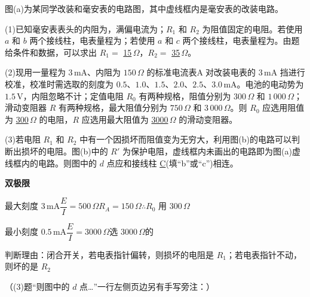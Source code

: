\begin{problem}[剪贴印刷题·9分]
图(a)为某同学改装和毫安表的电路图，其中虚线框内是毫安表的改装电路。%

(1)已知毫安表表头的内阻为，满偏电流为；$R_1$ 和 $R_2$ 为阻值固定的电阻。若使用 $a$ 和 $b$ 两个接线柱，电表量程为；若使用 $a$ 和 $c$ 两个接线柱，电表量程为。由题给条件和数据，可以求出 $R_1=$ \underline{\hspace{0.6em}15\hspace{0.6em}}\,$\Omega$，$R_2=$ \underline{\hspace{0.6em}35\hspace{0.6em}}\,$\Omega$。%

(2)现用一量程为 $3\,\mathrm{mA}$、内阻为 $150\,\Omega$ 的标准电流表\textcircled{A}对改装电表的 $3\,\mathrm{mA}$ 挡进行校准，校准时需选取的刻度为 $0.5$、$1.0$、$1.5$、$2.0$、$2.5$、$3.0\,\mathrm{mA}$。电池的电动势为 $1.5\,\mathrm{V}$，内阻忽略不计；定值电阻 $R_0$ 有两种规格，阻值分别为 $300\,\Omega$ 和 $1\,000\,\Omega$；滑动变阻器 $R$ 有两种规格，最大阻值分别为 $750\,\Omega$ 和 $3\,000\,\Omega$。则 $R_0$ 应选用阻值为 \underline{\hspace{0.4em}300\hspace{0.4em}}\,$\Omega$ 的电阻，$R$ 应选用最大阻值为 \underline{\hspace{0.6em}3000\hspace{0.6em}}\,$\Omega$ 的滑动变阻器。%

(3)若电阻 $R_1$ 和 $R_2$ 中有一个因损坏而阻值变为无穷大，利用图(b)的电路可以判断出损坏的电阻。图(b)中的 $R'$ 为保护电阻，虚线框内未画出的电路即为图(a)虚线框内的电路。则图中的 $d$ 点应和接线柱 \underline{\hspace{0.5em}C\hspace{0.5em}}(填“b”或“c”)相连。%

\begin{solution}
\textbf{双极限}%

最大刻度 $3\,\mathrm{mA}$\quad $\dfrac{E}{I}=500\,\Omega$\quad $R_A=150\,\Omega$\quad $\therefore R_0$ 用 $300\,\Omega$

最小刻度 $0.5\,\mathrm{mA}$\quad $\dfrac{E}{I}=3000\,\Omega$\quad 选 $3000\,\Omega$的

判断理由：闭合开关，若电表指针偏转，则损坏的电阻是 $R_1$；若电表指针不动，则坏的是 $R_2$%

（(3)题“则图中的 $d$ 点…”一行左侧页边另有手写旁注：）
\end{solution}
\end{problem}
